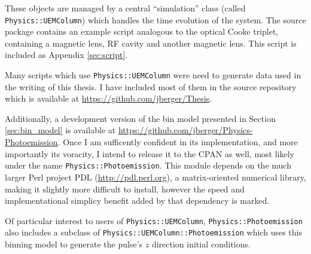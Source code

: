 These objects are managed by a central ``simulation'' class (called \verb!Physics::UEMColumn!) which handles the time evolution of the system.
The source package contains an example script analogous to the optical Cooke triplet, containing a magnetic lens, RF cavity and another magnetic lens.
This script is included as Appendix \ref{sec:script}.

Many scripts which use \verb!Physics::UEMColumn! were need to generate data used in the writing of this thesis.
I have included most of them in the source repository which is available at \url{https://github.com/jberger/Thesis}.

Additionally, a development version of the bin model presented in Section \ref{sec:bin_model} is available at \url{https://github.com/jberger/Physics-Photoemission}.
Once I am sufficently confident in its implementation, and more importantly its voracity, I intend to release it to the CPAN as well, most likely under the name \verb!Physics::Photoemission!.
This module depends on the much larger Perl project PDL (\url{http://pdl.perl.org}), a matrix-oriented numerical library, making it slightly more difficult to install, however the speed and implementational simplicy benefit added by that dependency is marked.

Of particular interest to users of \verb!Physics::UEMColumn!, \verb!Physics::Photoemission! also includes a subclass of \verb!Physics::UEMColumn::Photoemission! which uses this binning model to generate the pulse's $z$ direction initial conditions.


